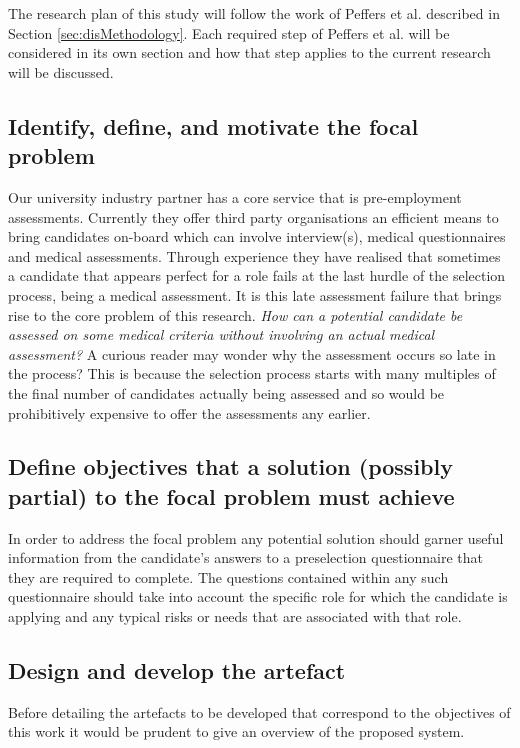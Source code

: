 The research plan of this study will follow the work of Peffers et al. described in Section \ref{sec:disMethodology}. Each required step of Peffers et al. will be considered in its own section and how that step applies to the current research will be discussed.

\subsection{Identify, define, and motivate the focal problem}

Our university industry partner has a core service that is pre-employment assessments.
Currently they offer third party organisations an efficient means to bring
candidates on-board which can involve interview(s), medical questionnaires and medical
assessments. Through experience they have realised that sometimes a candidate that appears
perfect for a role fails at the last hurdle of the selection process, being a medical assessment.
It is this late assessment failure that brings rise to the core problem of this research. \textit{How can
    a potential candidate be assessed on some medical criteria without involving an actual medical
    assessment?} A curious reader may wonder why the assessment occurs so late in the process?
This is because the selection process
starts with many multiples of the final number of candidates actually being assessed and so would be prohibitively expensive
to offer the assessments any earlier.


\subsection{Define objectives that a solution (possibly partial) to the focal problem must achieve}

In order to address the focal problem any potential solution should garner useful information from the candidate's answers
to a preselection questionnaire that they are required to complete. The questions contained
within any such questionnaire should take into account the specific role for which the candidate is applying
and any typical risks or needs that are associated with that role.

\subsection{Design and develop the artefact}

Before detailing the artefacts to be developed that correspond to the objectives of this work it would be prudent to give an overview of the proposed system.

